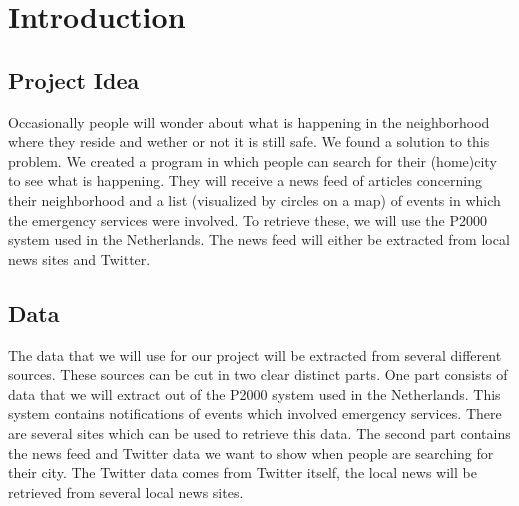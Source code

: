 \section{Introduction}
\subsection*{Project Idea}
Occasionally people will wonder about what is happening in the neighborhood where they reside and wether or not it is still safe.
We found a solution to this problem. 
We created a program in which people can search for their (home)city to see what is happening. 
They will receive a news feed of articles concerning their neighborhood and a list (visualized by circles on a map) of events in which the emergency services were involved. 
To retrieve these, we will use the P2000 system used in the Netherlands. The news feed will either be extracted from local news sites and Twitter.

\subsection*{Data}
The data that we will use for our project will be extracted from several different sources. 
These sources can be cut in two clear distinct parts. 
One part consists of data that we will extract out of the P2000 system used in the Netherlands. 
This system contains notifications of events which involved emergency services. 
There are several sites which can be used to retrieve this data.
The second part contains the news feed and Twitter data we want to show when people are searching for their city. 
The Twitter data comes from Twitter itself, the local news will be retrieved from several local news sites. 

